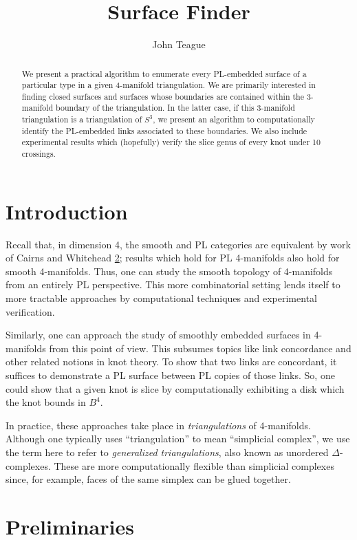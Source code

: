 \documentclass[11pt]{amsart}
\author{John Teague}
\title{Surface Finder}
\begin{document}
\maketitle

\begin{abstract}
	We present a practical algorithm to enumerate every PL-embedded surface of a particular type in a given 4-manifold triangulation. We are primarily interested in finding closed surfaces and surfaces whose boundaries are contained within the 3-manifold boundary of the triangulation. In the latter case, if this 3-manifold triangulation is a triangulation of $S^3$, we present an algorithm to computationally identify the PL-embedded links associated to these boundaries. We also include experimental results which (hopefully) verify the slice genus of every knot under 10 crossings.
\end{abstract}

\section{Introduction}

Recall that, in dimension 4, the smooth and PL categories are equivalent by work of Cairns and Whitehead \ref{}; results which hold for PL 4-manifolds also hold for smooth 4-manifolds. Thus, one can study the smooth topology of 4-manifolds from an entirely PL perspective. This more combinatorial setting lends itself to more tractable approaches by computational techniques and experimental verification. 

Similarly, one can approach the study of smoothly embedded surfaces in 4-manifolds from this point of view. This subsumes topics like link concordance and other related notions in knot theory. To show that two links are concordant, it suffices to demonstrate a PL surface between PL copies of those links. So, one could show that a given knot is slice by computationally exhibiting a disk which the knot bounds in $B^4$.

In practice, these approaches take place in \textit{triangulations} of 4-manifolds. Although one typically uses ``triangulation'' to mean ``simplicial complex'', we use the term here to refer to \textit{generalized triangulations}, also known as unordered $\Delta$-complexes. These are more computationally flexible than simplicial complexes since, for example, faces of the same simplex can be glued together.



\section{Preliminaries}
\end{document}

